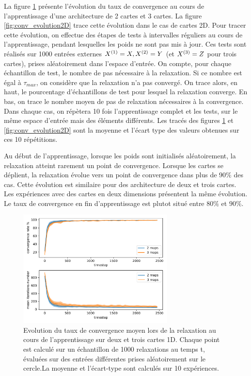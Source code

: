 La figure \ref{fig:conv_evolution} présente l'évolution du taux de convergence au cours de l'apprentissage d'une architecture de 2 cartes et 3 cartes. La figure \ref{fig:conv_evolution2D} trace  cette évolution dans le cas de cartes 2D. Pour tracer cette évolution, on effectue des étapes de tests à intervalles réguliers au cours de l'apprentissage, pendant lesquelles les poids ne sont pas mis à jour. Ces tests sont réalisés sur 1000 entrées externes $X^{({1})} = X, X^{({2})}=Y$ (et $X^{({3})}=Z$ pour trois cartes), prises aléatoirement dans l'espace d'entrée. On compte, pour chaque échantillon de test, le nombre de pas nécessaire à la relaxation. Si ce nombre est égal à $\tau_{max}$, on considère que la relaxation n'a pas convergé. On trace alors, en haut, le pourcentage d'échantillons de test pour lesquel la relaxation converge. En bas, on trace le nombre moyen de pas de relaxation nécessaires à la convergence.
Dans chaque cas, on répètera 10 fois l'apprentissage complet et les tests, sur le même espace d'entrée mais des éléments différents. Les tracés des figures \ref{fig:conv_evolution} et \ref{fig:conv_evolution2D} sont la moyenne et l'écart type des valeurs obtenues sur ces 10 répétitions.

Au début de l'apprentissage, lorsque les poids sont initialisés aléatoirement, la relaxation atteint rarement un point de convergence. Lorsque les cartes se déplient, la relaxation évolue vers un point de convergence dans plus de $90 \%$ des cas. Cette évolution est similaire pour des architecture de deux et trois cartes. Les expériences avec des cartes en deux dimensions présentent la même évolution. Le taux de convergence en fin d'apprentissage est plutot situé entre $80 \%$ et $90 \%$.
 
\begin{figure}
\centering
\includegraphics[width=0.7\textwidth]{1D_conv_evolution_total.pdf}
\caption{Evolution du taux de convergence moyen lors de la relaxation au cours de l'apprentissage sur deux et trois cartes 1D. Chaque point est calculé sur un échantillon de 1000 relaxations au temps t, évaluées sur des entrées différentes prises aléatoirement sur le cercle.La moyenne et l'écart-type sont calculés sur 10 expériences.}
\label{fig:conv_evolution}
\end{figure}


